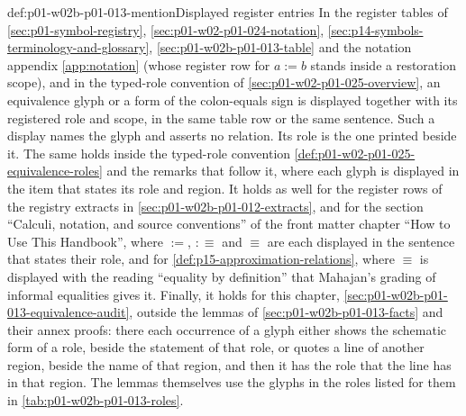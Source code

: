 \begin{hbconvention}{def:p01-w02b-p01-013-mention}{Displayed register entries}
In the register tables of \cref{sec:p01-symbol-registry},
\cref{sec:p01-w02-p01-024-notation},
\cref{sec:p14-symbols-terminology-and-glossary},
\cref{sec:p01-w02b-p01-013-table} and the notation appendix
\cref{app:notation} (whose register row for \(a\mathrel{:=}b\) stands
inside a restoration scope), and in the typed-role
convention of \cref{sec:p01-w02-p01-025-overview}, an equivalence glyph or
a form of the colon-equals sign is
displayed together with its registered role and scope, in the same table row
or the same sentence.  Such a display names the glyph and asserts no relation.
Its role is the one printed beside it.  The same holds inside the
typed-role convention \cref{def:p01-w02-p01-025-equivalence-roles} and the
remarks that follow it, where each glyph is displayed in the item that
states its role and region.  It holds as well for the register rows of the
registry extracts in \cref{sec:p01-w02b-p01-012-extracts}, and for the
section ``Calculi, notation, and source conventions'' of the front matter
chapter ``How to Use This Handbook'', where \(\mathrel{:=}\),
\(\mathrel{:\equiv}\) and \(\equiv\) are each displayed in the sentence
that states their role, and for \cref{def:p15-approximation-relations},
where \(\equiv\) is displayed with the reading ``equality by definition''
that Mahajan's grading of informal equalities gives it.  Finally, it holds
for this chapter, \cref{sec:p01-w02b-p01-013-equivalence-audit}, outside the
lemmas of \cref{sec:p01-w02b-p01-013-facts} and their annex proofs: there
each occurrence of a glyph either shows the schematic form of a role,
beside the statement of that role, or quotes a line of another region,
beside the name of that region, and then it has the role that the line has
in that region.  The lemmas themselves use the glyphs in the roles listed
for them in \cref{tab:p01-w02b-p01-013-roles}.


\end{hbconvention}
